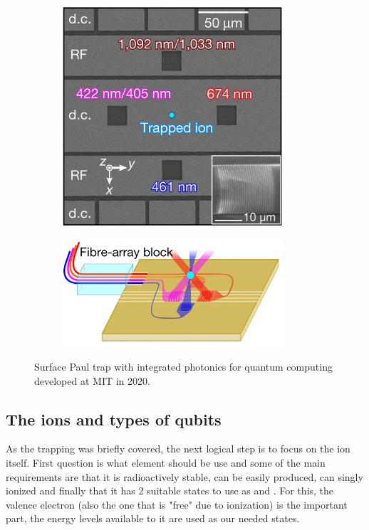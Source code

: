 \begin{figure}[H]
    \centering
    \begin{subfigure}[b]{0.45\textwidth}
        \centering
        \includegraphics[width=0.9\textwidth]{images/ITQC_MIT_1.jpg}
    \end{subfigure}
    \hfill
    \begin{subfigure}[b]{0.45\textwidth}
        \centering
        \includegraphics[width=0.9\textwidth]{images/ITQC_MIT_2.jpg}
    \end{subfigure}
    \caption{Surface Paul trap with integrated photonics for quantum computing developed at MIT in 2020.}\label{fig:ITQC_MIT}
\end{figure}

\subsection{The ions and types of qubits}
As the trapping was briefly covered, the next logical step is to focus on the ion itself.
First question is what element should be use and some of the main requirements are that it is radioactively stable, can be easily produced, can singly ionized and finally that it has 2 suitable states to use as \kz and \ko.
For this, the valence electron (also the one that is "free" due to ionization) is the important part, the energy levels available to it are used as our needed states.

